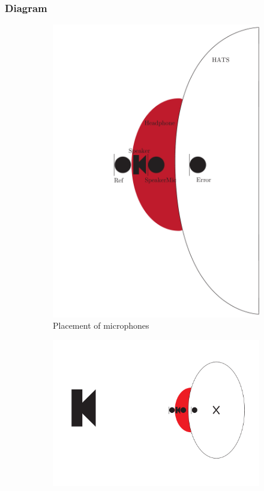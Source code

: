 \subsubsection{Diagram}
\begin{figure}[H]
	\centering
	\begin{subfigure}[b]{.4\textwidth}
		\centering
		\includegraphics[width=\textwidth]{../Journal/Experiments/AngleOfIncidence/AngleOfIncidenceSchematic.pdf}
		\caption{Placement of microphones}
		\label{fig:AngOgIndMicplace}
	\end{subfigure}\qquad
	\begin{subfigure}[b]{.4\textwidth}
		\includegraphics[width=\textwidth]{../Journal/Experiments/AngleOfIncidence/AngleOfIncidenceOnAxis.pdf}

\end{subfigure}
\end{figure}

